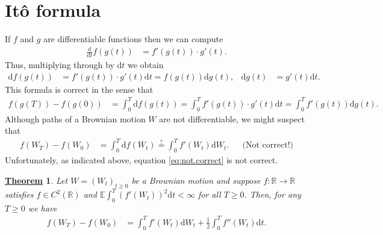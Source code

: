 \documentclass[12pt]{book}
\numberwithin{equation}{chapter}
\theoremstyle{plain}
\newtheorem{theorem}{\underline{Theorem}}
\numberwithin{theorem}{section}
\theoremstyle{definition}
\numberwithin{exercise}{chapter}
\newcommand{\<}{\langle}
\renewcommand{\>}{\rangle}
\renewcommand{\(}{\left(}
\renewcommand{\)}{\right)}
\renewcommand{\[}{\left[}
\renewcommand{\]}{\right]}
\newcommand\Eb{\mathds{E}}
\newcommand\Rb{\mathds{R}}
\newcommand\dd{\mathrm{d}}
\begin{document}
\section{It\^o formula}
\label{sec:ito.integral}
If $f$ and $g$ are differentiable functions then we can compute
\begin{align}
\frac{\dd}{\dd t}f(g(t))
	&=	f'(g(t)) \cdot g'(t) .
\end{align}
Thus, multiplying through by $\dd t$ we obtain
\begin{align}
\dd f(g(t))
	&=	f'(g(t)) \cdot g'(t) \dd t = f(g(t)) \dd g(t) , &
\dd g(t)
	&=	g'(t) \dd t .
\end{align}
This formula is correct in the sense that
\begin{align}
f(g(T)) - f(g(0))
	&=	\int_0^T \dd f(g(t)) = \int_0^T f'(g(t)) \cdot g'(t) \dd t 
	=		\int_0^T f'(g(t)) \dd g(t) .
\end{align}
Although paths of a Brownian motion $W$ are not differentiable, we might suspect that 
\begin{align}
f(W_T) - f(W_0)
	&=	\int_0^T \dd f(W_t) \stackrel{?}{=} \int_0^T f'(W_t) \dd W_t . &
	&   \text{(Not correct!)} \label{eq:not.correct}
\end{align}
Unfortunately, as indicated above, equation \eqref{eq:not.correct} is not correct.

\begin{theorem}
\label{thm:ito.bm}
Let $W = (W_t)_{t \geq 0}$ be a Brownian motion and suppose $f : \Rb \to \Rb$ satisfies $f \in C^2(\Rb)$ and $\Eb \int_0^T ( f'(W_t) )^2 \dd t < \infty$ for all $T \geq 0$.  Then, for any $T \geq 0$ we have
\begin{align}
f(W_T) - f(W_0)
	&=	\int_0^T f'(W_t) \dd W_t + \tfrac{1}{2} \int_0^T f''(W_t) \dd t . \label{eq:ito.bm}
\end{align}
\end{theorem}
\end{document}
